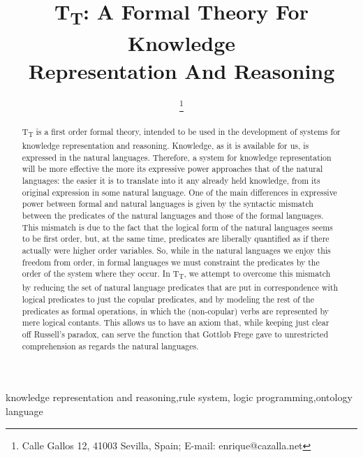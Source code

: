 \documentclass{IOS-Book-Article}     %
\def\hb{\hbox to 10.7 cm{}}
\begin{document}
\pagestyle{headings}
\def\thepage{}

\begin{frontmatter}          %
%
\title{T\textsubscript{T}: A Formal Theory For Knowledge\\
Representation And Reasoning}

\markboth{}{February 2016\hb}

\author{ 
\thanks{Calle Gallos 12, 41003 Sevilla, Spain; E-mail: enrique@cazalla.net}}
%
%
\begin{abstract}
T\textsubscript{T} is a first order formal theory, intended to be used in
the development of systems for knowledge representation and reasoning.
Knowledge, as it is available for us, is expressed in the natural languages.
Therefore, a system for knowledge representation will be more effective
the more its expressive power approaches that of the natural languages:
the easier it is to translate into it any already held knowledge, from its
original expression in some natural language.
One of the main differences in expressive power between formal and natural
languages is given by the
syntactic mismatch between the predicates of the natural
languages and those of the formal languages. This mismatch is due to the fact
that the logical form of the natural languages seems to be first order, but,
at the  same time, predicates are liberally quantified as if there
actually were higher order variables.
So, while in the natural languages we enjoy this freedom from order,
in formal languages we must constraint the predicates by the order of
the system where they occur.
In T\textsubscript{T}, we attempt to overcome this
mismatch by reducing the set of natural language predicates that are
put in correspondence with logical predicates to just the copular predicates,
and by modeling the rest of the predicates as formal operations,
in which the (non-copular) verbs are represented by mere logical contants.
This allows us to have an axiom that, while keeping just clear off
Russell's paradox, can serve the function that Gottlob Frege gave to
unrestricted comprehension as regards the natural languages.
\end{abstract}

\begin{keyword}
knowledge representation and reasoning\sep rule system\sep
logic programming\sep ontology language
\end{keyword}

\end{frontmatter}
\markboth{February 2016\hb}{February 2016\hb}
\end{document}
